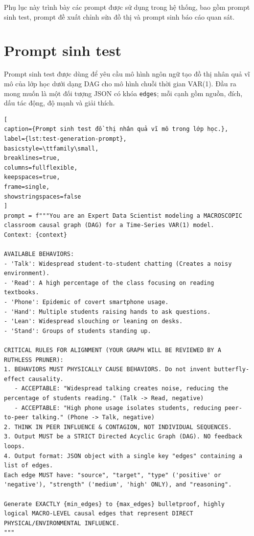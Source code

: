 Phụ lục này trình bày các prompt được sử dụng trong hệ thống, bao gồm prompt sinh test, prompt đề xuất chỉnh sửa đồ thị và prompt sinh báo cáo quan sát.

\section{Prompt sinh test}

Prompt sinh test được dùng để yêu cầu mô hình ngôn ngữ tạo đồ thị nhân quả vĩ mô của lớp học dưới dạng DAG cho mô hình chuỗi thời gian VAR(1). Đầu ra mong muốn là một đối tượng JSON có khóa \texttt{edges}; mỗi cạnh gồm nguồn, đích, dấu tác động, độ mạnh và giải thích.

\begin{lstlisting}[
caption={Prompt sinh test đồ thị nhân quả vĩ mô trong lớp học.},
label={lst:test-generation-prompt},
basicstyle=\ttfamily\small,
breaklines=true,
columns=fullflexible,
keepspaces=true,
frame=single,
showstringspaces=false
]
prompt = f"""You are an Expert Data Scientist modeling a MACROSCOPIC classroom causal graph (DAG) for a Time-Series VAR(1) model.
Context: {context}

AVAILABLE BEHAVIORS:
- 'Talk': Widespread student-to-student chatting (Creates a noisy environment).
- 'Read': A high percentage of the class focusing on reading textbooks.
- 'Phone': Epidemic of covert smartphone usage.
- 'Hand': Multiple students raising hands to ask questions.
- 'Lean': Widespread slouching or leaning on desks.
- 'Stand': Groups of students standing up.

CRITICAL RULES FOR ALIGNMENT (YOUR GRAPH WILL BE REVIEWED BY A RUTHLESS PRUNER):
1. BEHAVIORS MUST PHYSICALLY CAUSE BEHAVIORS. Do not invent butterfly-effect causality.
   - ACCEPTABLE: "Widespread talking creates noise, reducing the percentage of students reading." (Talk -> Read, negative)
   - ACCEPTABLE: "High phone usage isolates students, reducing peer-to-peer talking." (Phone -> Talk, negative)
2. THINK IN PEER INFLUENCE & CONTAGION, NOT INDIVIDUAL SEQUENCES.
3. Output MUST be a STRICT Directed Acyclic Graph (DAG). NO feedback loops.
4. Output format: JSON object with a single key "edges" containing a list of edges.
Each edge MUST have: "source", "target", "type" ('positive' or 'negative'), "strength" ('medium', 'high' ONLY), and "reasoning".

Generate EXACTLY {min_edges} to {max_edges} bulletproof, highly logical MACRO-LEVEL causal edges that represent DIRECT PHYSICAL/ENVIRONMENTAL INFLUENCE.
"""
\end{lstlisting}


